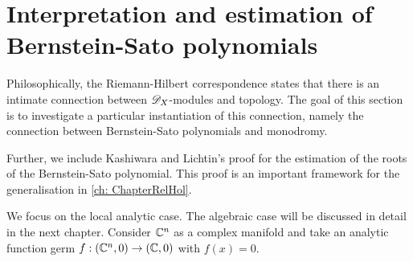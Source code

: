\section{Interpretation and estimation of Bernstein-Sato polynomials}\label{sec: MonodromyBS}
Philosophically, the Riemann-Hilbert correspondence states that there is an intimate connection between $\mathscr{D}_X$-modules and topology.
The goal of this section is to investigate a particular instantiation of this connection, namely the connection between Bernstein-Sato polynomials and monodromy.


Further, we include Kashiwara and Lichtin's proof for the estimation of the roots of the Bernstein-Sato polynomial.
This proof is an important framework for the generalisation in \cref{ch: ChapterRelHol}.

We focus on the local analytic case.
The algebraic case will be discussed in detail in the next chapter.
Consider $\mathbb{C}^n$ as a complex manifold and take an analytic function germ $f:(\mathbb{C}^n,0)\to (\mathbb{C},0)$ with  $f(x) = 0$.
